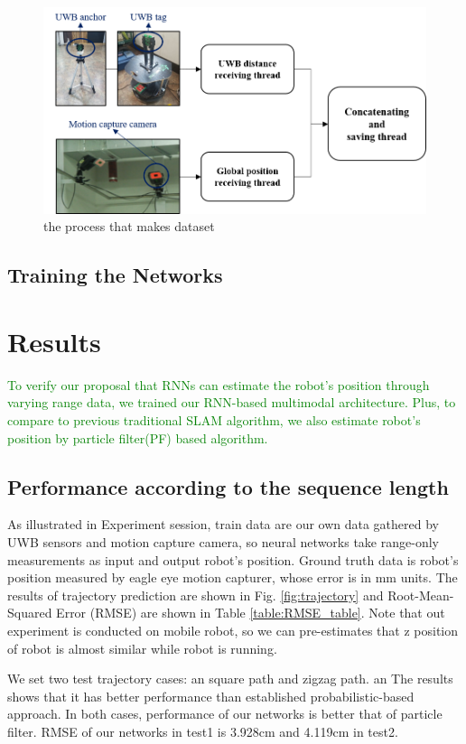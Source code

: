 \documentclass{ieeeaccess}
\begin{document}
\begin{figure}[h!]
	\centering
	\includegraphics[width=0.9\linewidth]{dataset_process}
	\caption{the process that makes dataset}
	\label{fig:dataset} 	
\end{figure}

\subsection{Training the Networks}


\section{Results}

\textcolor{green}{To verify our proposal that RNNs can estimate the robot's position through varying range data, we trained our RNN-based multimodal architecture. Plus, to compare to previous traditional SLAM algorithm, we also estimate robot's position by particle filter(PF) based algorithm.}
\subsection{Performance according to the sequence length}

As illustrated in Experiment session, train data are our own data gathered by UWB sensors and motion capture camera, so neural networks take range-only measurements as input and output robot's position. Ground truth data is robot's position measured by eagle eye motion capturer, whose error is in mm units. The results of trajectory prediction are shown in Fig. \ref{fig:trajectory} and Root-Mean-Squared Error (RMSE) are shown in Table \ref{table:RMSE_table}. Note that out experiment is conducted on mobile robot, so we can pre-estimates that z position of robot is almost similar while robot is running. 

We set two test trajectory cases: an square path and zigzag path. an The results shows that it has better performance than established probabilistic-based approach. In both cases, performance of our networks  is better that of particle filter. RMSE of our networks in test1 is 3.928cm and 4.119cm in test2.
\end{document}
